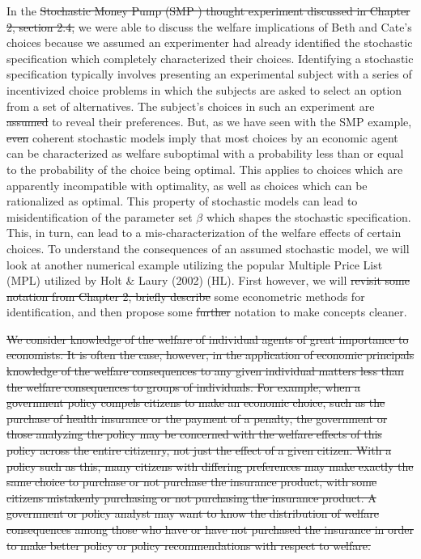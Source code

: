 \documentclass[11pt,a4paper]{article} %
\providecommand{\DIFaddtex}[1]{{\protect\color{blue}\uwave{#1}}} %
\providecommand{\DIFdeltex}[1]{{\protect\color{red}\sout{#1}}}                      %
\providecommand{\DIFaddbegin}{} %
\providecommand{\DIFaddend}{} %
\providecommand{\DIFdelbegin}{} %
\providecommand{\DIFdelend}{} %
\providecommand{\DIFadd}[1]{\texorpdfstring{\DIFaddtex{#1}}{#1}} %
\providecommand{\DIFdel}[1]{\texorpdfstring{\DIFdeltex{#1}}{}} %
\newcommand{\DIFscaledelfig}{0.5}
\newlength{\DIFdelgraphicswidth} %
\newlength{\DIFdelgraphicsheight} %
\newcommand{\DIFaddincludegraphics}[2][]{{\color{blue}\fbox{\DIFOincludegraphics[#1]{#2}}}} %
\newcommand{\DIFdelincludegraphics}[2][]{%
\sbox{\DIFdelgraphicsbox}{\DIFOincludegraphics[#1]{#2}}%
\settoboxwidth{\DIFdelgraphicswidth}{\DIFdelgraphicsbox} %
\settoboxtotalheight{\DIFdelgraphicsheight}{\DIFdelgraphicsbox} %
\scalebox{\DIFscaledelfig}{%
\parbox[b]{\DIFdelgraphicswidth}{\usebox{\DIFdelgraphicsbox}\\[-\baselineskip] \rule{\DIFdelgraphicswidth}{0em}}\llap{\resizebox{\DIFdelgraphicswidth}{\DIFdelgraphicsheight}{%
\setlength{\unitlength}{\DIFdelgraphicswidth}%
\begin{picture}(1,1)%
\thicklines\linethickness{2pt} %
{\color[rgb]{1,0,0}\put(0,0){\framebox(1,1){}}}%
{\color[rgb]{1,0,0}\put(0,0){\line( 1,1){1}}}%
{\color[rgb]{1,0,0}\put(0,1){\line(1,-1){1}}}%
\end{picture}%
}\hspace*{3pt}}} %
} %
\DeclareRobustCommand{\DIFaddbegin}{\DIFOaddbegin \let\includegraphics\DIFaddincludegraphics} %
\DeclareRobustCommand{\DIFaddend}{\DIFOaddend \let\includegraphics\DIFOincludegraphics} %
\DeclareRobustCommand{\DIFdelbegin}{\DIFOdelbegin \let\includegraphics\DIFdelincludegraphics} %
\DeclareRobustCommand{\DIFdelend}{\DIFOaddend \let\includegraphics\DIFOincludegraphics} %
\begin{document}
In the \DIFdelbegin \DIFdel{Stochastic Money Pump (SMP ) thought experiment discussed in Chapter 2, section 2.4, }\DIFdelend \DIFaddbegin \DIFadd{SMP }\DIFaddend we were able to discuss the welfare implications of Beth and Cate's choices because we assumed an experimenter had already identified the stochastic specification which completely characterized their choices.
Identifying a stochastic specification \DIFaddbegin \DIFadd{in reality }\DIFaddend typically involves presenting an experimental subject with a series of incentivized choice problems in which the subjects are asked to select an option from a set of alternatives.
The subject's choices in such an experiment are \DIFdelbegin \DIFdel{assumed }\DIFdelend \DIFaddbegin \DIFadd{said }\DIFaddend to reveal their preferences.
But, as we have seen with the SMP example, \DIFdelbegin \DIFdel{even }\DIFdelend coherent stochastic models imply that most choices by an economic agent can be characterized as welfare suboptimal with a probability less than or equal to the probability of the choice being optimal.
This applies to choices which are apparently incompatible with optimality, as well as choices which can be rationalized as optimal.
This property of stochastic models can lead to misidentification of the parameter set $\beta$ which shapes the stochastic specification.
This, in turn, can lead to a mis-characterization of the welfare effects of certain choices.
To understand the consequences of an assumed stochastic model, we will look at another numerical example utilizing the popular Multiple Price List (MPL) utilized by Holt \& Laury (2002) (HL).
First however, we will \DIFdelbegin \DIFdel{revisit some notation from Chapter 2, briefly describe }\DIFdelend \DIFaddbegin \DIFadd{describe briefly }\DIFaddend some econometric methods for identification, and then propose some \DIFdelbegin \DIFdel{further }\DIFdelend \DIFaddbegin \DIFadd{more }\DIFaddend notation to make concepts cleaner.

\DIFdelbegin \DIFdel{We consider knowledge of the welfare of individual agents of great importance to economists.
It is often the case, however, in the application of economic principals knowledge of the welfare consequences to any given individual matters less than the welfare consequences to groups of individuals.
For example, when a government policy compels citizens to make an economic choice, such as the purchase of health insurance or the payment of a penalty, the government or those analyzing the policy may be concerned with the welfare effects of this policy across the entire citizenry, not just the effect of a given citizen.
With a policy such as this, many citizens with differing preferences may make exactly the same choice to purchase or not purchase the insurance product, with some citizens mistakenly purchasing or not purchasing the insurance product.
A government or policy analyst may want to know the distribution of welfare consequences among those who have or have not purchased the insurance in order to make better policy or policy recommendations with respect to welfare.
}%
\end{document}

